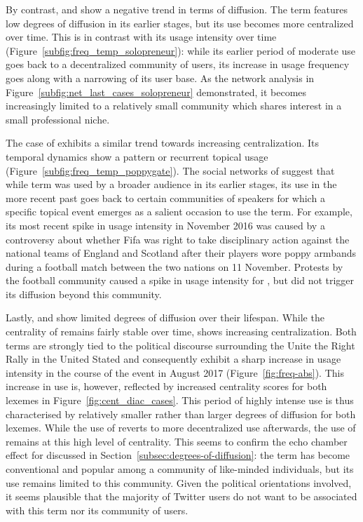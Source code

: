 \documentclass[
  a4paper,
  abstract=on,
  captions=tableabove
  ]{scrartcl}
\begin{document}
      By contrast,  and  show a negative trend in terms of diffusion. The term  features low degrees of diffusion in its earlier stages, but its use becomes more centralized over time. This is in contrast with its usage intensity over time (Figure~\ref{subfig:freq_temp_solopreneur}): while its earlier period of moderate use goes back to a decentralized community of users, its increase in usage frequency goes along with a narrowing of its user base. As the network analysis in Figure~\ref{subfig:net_last_cases_solopreneur} demonstrated, it becomes increasingly limited to a relatively small community which shares interest in a small professional niche.   

      The case of  exhibits a similar trend towards increasing centralization. Its temporal dynamics show a pattern or recurrent topical usage (Figure~\ref{subfig:freq_temp_poppygate}). The social networks of  suggest that while term was used by a broader audience in its earlier stages, its use in the more recent past goes back to certain communities of speakers for which a specific topical event emerges as a salient occasion to use the term. For example, its most recent spike in usage intensity in November 2016 was caused by a controversy about whether Fifa was right to take disciplinary action against the national teams of England and Scotland after their players wore poppy armbands during a football match between the two nations on 11 November. Protests by the football community caused a spike in usage intensity for , but did not trigger its diffusion beyond this community.

      Lastly,  and  show limited degrees of diffusion over their lifespan. While the centrality of  remains fairly stable over time,  shows increasing centralization. Both terms are strongly tied to the political discourse surrounding the Unite the Right Rally in the United Stated and consequently exhibit a sharp increase in usage intensity in the course of the event in August 2017 (Figure~\ref{fig:freq-abs}). This increase in use is, however, reflected by increased centrality scores for both lexemes in Figure~\ref{fig:cent_diac_cases}. This period of highly intense use is thus characterised by relatively smaller rather than larger degrees of diffusion for both lexemes. While the use of  reverts to more decentralized use afterwards, the use of  remains at this high level of centrality. This seems to confirm the echo chamber effect for  discussed in Section~\ref{subsec:degrees-of-diffusion}: the term has become conventional and popular among a community of like-minded individuals, but its use remains limited to this community. Given the political orientations involved, it seems plausible that the majority of Twitter users do not want to be associated with this term nor its community of users.  
\end{document}
